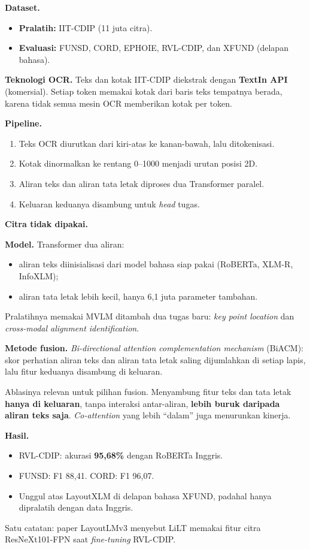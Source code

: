 \textbf{Dataset.}
\begin{itemize}
  \item \textbf{Pralatih:} IIT-CDIP (11 juta citra).
  \item \textbf{Evaluasi:} FUNSD, CORD, EPHOIE, RVL-CDIP, dan XFUND (delapan bahasa).
\end{itemize}

\textbf{Teknologi OCR.} Teks dan kotak IIT-CDIP diekstrak dengan \textbf{TextIn API}
(komersial). Setiap token memakai kotak dari baris teks tempatnya berada, karena tidak
semua mesin OCR memberikan kotak per token.

\textbf{Pipeline.}
\begin{enumerate}
  \item Teks OCR diurutkan dari kiri-atas ke kanan-bawah, lalu ditokenisasi.
  \item Kotak dinormalkan ke rentang 0--1000 menjadi urutan posisi 2D.
  \item Aliran teks dan aliran tata letak diproses dua Transformer paralel.
  \item Keluaran keduanya disambung untuk \textit{head} tugas.
\end{enumerate}
\textbf{Citra tidak dipakai.}

\textbf{Model.} Transformer dua aliran:
\begin{itemize}
  \item aliran teks diinisialisasi dari model bahasa siap pakai (RoBERTa, XLM-R, InfoXLM);
  \item aliran tata letak lebih kecil, hanya 6,1 juta parameter tambahan.
\end{itemize}
Pralatihnya memakai MVLM ditambah dua tugas baru: \textit{key point location} dan
\textit{cross-modal alignment identification}.

\textbf{Metode fusion.} \textit{Bi-directional attention complementation mechanism} (BiACM):
skor perhatian aliran teks dan aliran tata letak saling dijumlahkan di setiap lapis, lalu
fitur keduanya disambung di keluaran.

Ablasinya relevan untuk pilihan fusion. Menyambung fitur teks dan tata letak \textbf{hanya
di keluaran}, tanpa interaksi antar-aliran, \textbf{lebih buruk daripada aliran teks
saja}. \textit{Co-attention} yang lebih \enquote{dalam} juga menurunkan kinerja.

\textbf{Hasil.}
\begin{itemize}
  \item RVL-CDIP: akurasi \textbf{95,68\%} dengan RoBERTa Inggris.
  \item FUNSD: F1 88,41. CORD: F1 96,07.
  \item Unggul atas LayoutXLM di delapan bahasa XFUND, padahal hanya dipralatih dengan data
  Inggris.
\end{itemize}
Satu catatan: paper LayoutLMv3 menyebut LiLT memakai fitur citra ResNeXt101-FPN saat
\textit{fine-tuning} RVL-CDIP.

